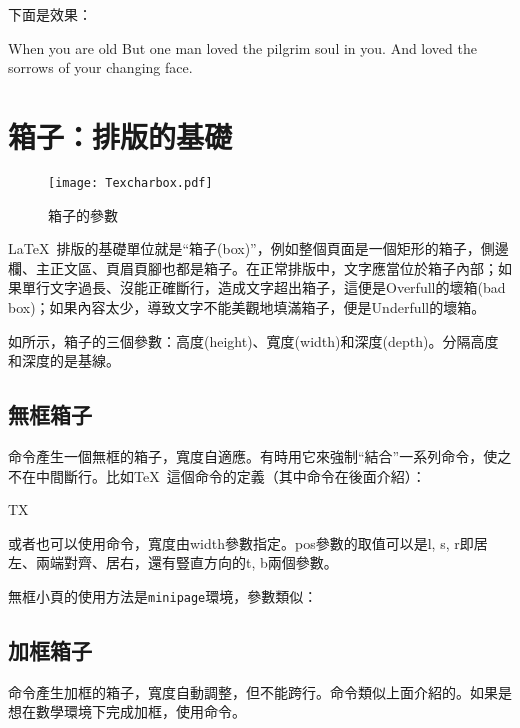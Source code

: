 下面是效果：
\begin{codeshow}
\begin{QuoteEnv}{When you are old}
But one man loved the pilgrim soul in you.
And loved the sorrows of your changing face.
\end{QuoteEnv}
\end{codeshow}

\section{箱子：排版的基礎}
\label{sec:box}

\begin{wrapfigure}{R}{0.4\textwidth}
\texttt{[image: Texcharbox.pdf]}
\caption{箱子的參數}
\label{fig:boxpara}
\end{wrapfigure}

\LaTeX\ 排版的基礎單位就是“箱子(box)”，例如整個頁面是一個矩形的箱子，側邊欄、主正文區、頁眉頁腳也都是箱子。在正常排版中，文字應當位於箱子內部；如果單行文字過長、沒能正確斷行，造成文字超出箱子，這便是Overfull的壞箱(bad box)；如果內容太少，導致文字不能美觀地填滿箱子，便是Underfull的壞箱。

如所示，箱子的三個參數：高度(height)、寬度(width)和深度(depth)。分隔高度和深度的是基線。

\subsection{無框箱子}
命令產生一個無框的箱子，寬度自適應。有時用它來強制“結合”一系列命令，使之不在中間斷行。比如\TeX\ 這個命令的定義（其中命令在後面介紹）：
\begin{latex}
\mbox{T\hspace{-0.1667em}\raisebox{-0.5ex}{E}\hspace{-0.125em}X}
\end{latex}

或者也可以使用命令，寬度由width參數指定。pos參數的取值可以是l, s, r即居左、兩端對齊、居右，還有豎直方向的t, b兩個參數。

無框小頁的使用方法是\texttt{minipage}環境，參數類似：

\subsection{加框箱子}
命令產生加框的箱子，寬度自動調整，但不能跨行。命令類似上面介紹的。如果是想在數學環境下完成加框，使用命令。

